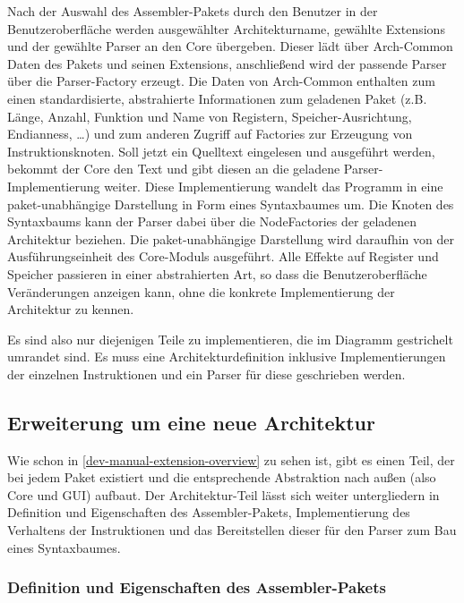 Nach der Auswahl des Assembler-Pakets durch den Benutzer in der
Benutzeroberfläche werden ausgewählter Architekturname, gewählte Extensions und
der gewählte Parser an den Core übergeben. Dieser lädt über Arch-Common Daten
des Pakets und seinen Extensions, anschließend wird der passende Parser über die
Parser-Factory erzeugt. Die Daten von Arch-Common enthalten zum einen
standardisierte, abstrahierte Informationen zum geladenen Paket (z.B. Länge,
Anzahl, Funktion und Name von Registern, Speicher-Ausrichtung, Endianness, \dots)
und zum anderen Zugriff auf Factories zur Erzeugung von Instruktionsknoten. Soll
jetzt ein Quelltext eingelesen und ausgeführt werden, bekommt der Core den Text
und gibt diesen an die geladene Parser-Implementierung weiter. Diese
Implementierung wandelt das Programm in eine paket-unabhängige Darstellung
in Form eines Syntaxbaumes um. Die Knoten des Syntaxbaums kann der Parser dabei
über die NodeFactories der geladenen Architektur beziehen. Die paket-unabhängige
Darstellung wird daraufhin von der Ausführungseinheit des Core-Moduls
ausgeführt. Alle Effekte auf Register und Speicher passieren in einer
abstrahierten Art, so dass die Benutzeroberfläche Veränderungen anzeigen kann,
ohne die konkrete Implementierung der Architektur zu kennen.

Es sind also nur diejenigen Teile zu implementieren, die im Diagramm gestrichelt
umrandet sind. Es muss eine Architekturdefinition inklusive Implementierungen
der einzelnen Instruktionen und ein Parser für diese geschrieben werden.

\subsection{Erweiterung um eine neue Architektur}

Wie schon in \autoref{dev-manual-extension-overview} zu sehen ist, gibt es einen
Teil, der bei jedem Paket existiert und die entsprechende Abstraktion nach außen
(also Core und GUI) aufbaut. Der Architektur-Teil lässt sich weiter
untergliedern in Definition und Eigenschaften des Assembler-Pakets,
Implementierung des Verhaltens der Instruktionen und das Bereitstellen dieser
für den Parser zum Bau eines Syntaxbaumes.

\subsubsection{Definition und Eigenschaften des Assembler-Pakets}

